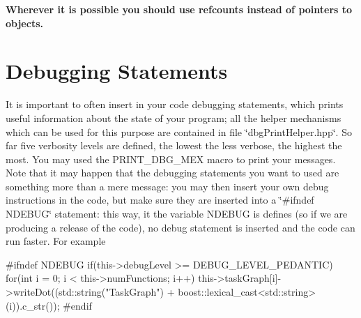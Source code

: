 {\bfseries Wherever it is possible you should use refcounts instead of pointers to objects.}\hypertarget{programming_style_debugging_statements}{}\section{Debugging Statements}\label{programming_style_debugging_statements}
It is important to often insert in your code debugging statements, which prints useful information about the state of your program; all the helper mechanisms which can be used for this purpose are contained in file \char`\"{}dbg\+Print\+Helper.\+hpp\char`\"{}. So far five verbosity levels are defined, the lowest the less verbose, the highest the most. You may used the {\ttfamily P\+R\+I\+N\+T\+\_\+\+D\+B\+G\+\_\+\+M\+EX} macro to print your messages. Note that it may happen that the debugging statements you want to used are something more than a mere message\+: you may then insert your own debug instructions in the code, but make sure they are inserted into a \char`\"{}\#ifndef N\+D\+E\+B\+U\+G\char`\"{} statement\+: this way, it the variable N\+D\+E\+B\+UG is defines (so if we are producing a release of the code), no debug statement is inserted and the code can run faster. For example \begin{DoxyVerb}#ifndef NDEBUG
if(this->debugLevel >= DEBUG_LEVEL_PEDANTIC)
{
   for(int i = 0; i < this->numFunctions; i++)
      this->taskGraph[i]->writeDot((std::string("TaskGraph") + boost::lexical_cast<std::string>(i)).c_str());
}
#endif
\end{DoxyVerb}
 